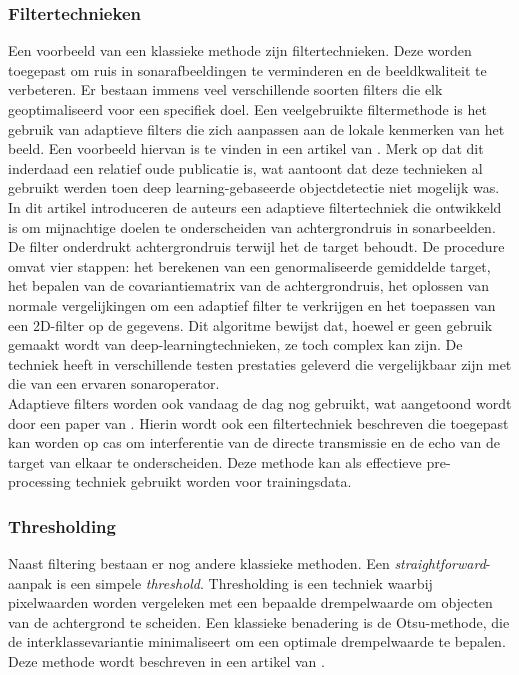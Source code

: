 \clearpage

\subsubsection{Filtertechnieken}

Een voorbeeld van een klassieke methode zijn filtertechnieken. Deze worden toegepast om ruis in sonarafbeeldingen te verminderen en de beeldkwaliteit te verbeteren. Er bestaan immens veel verschillende soorten filters die elk geoptimaliseerd voor een specifiek doel. Een veelgebruikte filtermethode is het gebruik van adaptieve filters die zich aanpassen aan de lokale kenmerken van het beeld. Een voorbeeld hiervan is te vinden in een artikel van \textcite{Aridgides_1995}. Merk op dat dit inderdaad een relatief oude publicatie is, wat aantoont dat deze technieken al gebruikt werden toen deep learning-gebaseerde objectdetectie niet mogelijk was. \\

In dit artikel introduceren de auteurs een adaptieve filtertechniek die ontwikkeld is om mijnachtige doelen te onderscheiden van achtergrondruis in sonarbeelden. De filter onderdrukt achtergrondruis terwijl het de target behoudt. De procedure omvat vier stappen: het berekenen van een genormaliseerde gemiddelde target, het bepalen van de covariantiematrix van de achtergrondruis, het oplossen van normale vergelijkingen om een adaptief filter te verkrijgen en het toepassen van een 2D-filter op de gegevens. Dit algoritme bewijst dat, hoewel er geen gebruik gemaakt wordt van deep-learningtechnieken, ze toch complex kan zijn. De techniek heeft in verschillende testen prestaties geleverd die vergelijkbaar zijn met die van een ervaren sonaroperator. \\

Adaptieve filters worden ook vandaag de dag nog gebruikt, wat aangetoond wordt door een paper van \textcite{Lourey_2017}. Hierin wordt ook een filtertechniek beschreven die toegepast kan worden op \gls{cas} om interferentie van de directe transmissie en de echo van de target van elkaar te onderscheiden. Deze methode kan als effectieve pre-processing techniek gebruikt worden voor trainingsdata.

\subsubsection{Thresholding}

Naast filtering bestaan er nog andere klassieke methoden. Een \emph{straightforward}-aanpak is een simpele \emph{threshold}. Thresholding is een techniek waarbij pixelwaarden worden vergeleken met een bepaalde drempelwaarde om objecten van de achtergrond te scheiden. Een klassieke benadering is de Otsu-methode, die de interklassevariantie minimaliseert om een optimale drempelwaarde te bepalen. Deze methode wordt beschreven in een artikel van \textcite{Otsu_1979}.

